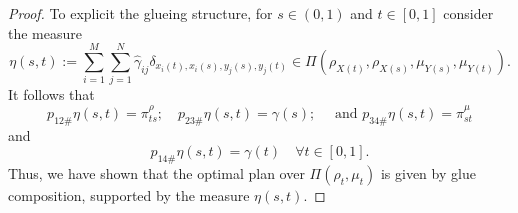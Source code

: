 \documentclass[10pt,a4paper]{amsart}
\begin{document}
\begin{proof}
To explicit the glueing structure, for $s \in (0, 1)$ and $t \in [0, 1]$ consider the measure
\begin{equation}
\label{eq: G(s, t) definition glueing measure}
    \eta(s,t) := \sum_{i=1}^M \sum_{j = 1}^N \hat\gamma_{ij} \delta_{x_i(t), x_i(s), y_j(s), y_j(t)} \in \Pi(\rho_{X(t)}, \rho_{X(s)}, \mu_{Y(s)}, \mu_{Y(t)}).
\end{equation}
It follows that
\begin{equation*}
    p_{12\#}\eta(s, t) = \pi^\rho_{ts};\quad p_{23\#} \eta(s, t) = \gamma(s); \quad \text{ and } p_{34\#} \eta(s, t) = \pi^\mu_{st}
\end{equation*}
and
\begin{equation*}
    p_{14\#} \eta(s, t) = \gamma(t) \quad\forall t \in [0, 1].
\end{equation*}
Thus, we have shown that the optimal plan over $\Pi(\rho_t, \mu_t)$ is given by glue composition, supported by the measure $\eta(s, t)$.
\end{proof}
\end{document}
